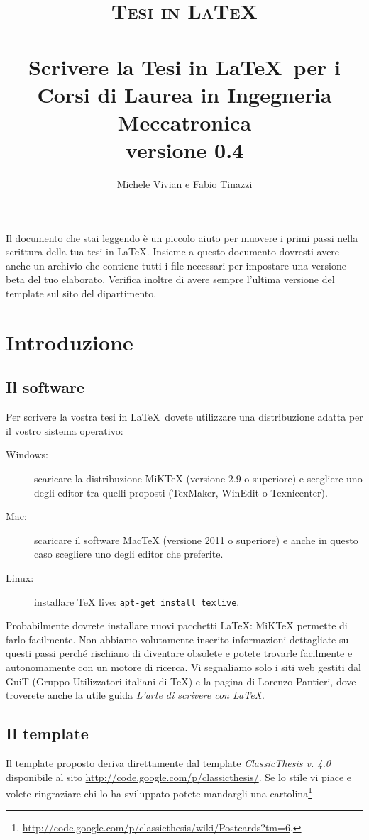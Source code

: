 \documentclass[paper=a4, fontsize=11pt]{scrartcl}	%
\title{
		\usefont{OT1}{bch}{b}{n}
		\normalfont \normalsize \textsc{Tesi in \LaTeX} \\ [25pt]
		\horrule{0.5pt} \\[0.4cm]
		\huge Scrivere la Tesi in \LaTeX~per i \\Corsi di Laurea in Ingegneria Meccatronica \\
		\Large versione 0.4
		\horrule{2pt} \\[0.5cm]
}
\author{
		\normalfont 								\normalsize
         Michele Vivian e Fabio Tinazzi \\[-3pt]		\normalsize
}
\date{}
\numberwithin{equation}{section}		%
\numberwithin{figure}{section}			%
\numberwithin{table}{section}				%
\begin{document}
\maketitle 

Il documento che stai leggendo \`e un piccolo aiuto per muovere i primi passi nella scrittura della tua tesi in \LaTeX. 
Insieme a questo documento dovresti avere anche un archivio che contiene tutti i file necessari per impostare una versione beta del tuo elaborato. 
Verifica inoltre di avere sempre l'ultima versione del template sul sito del dipartimento.

\section{Introduzione}
\subsection{Il software}
Per scrivere la vostra tesi in \LaTeX~dovete utilizzare una distribuzione adatta per il vostro sistema operativo:
\begin{description}
\item[Windows:] scaricare la distribuzione MiKTeX (versione 2.9 o superiore) e scegliere uno degli editor tra quelli proposti (TexMaker, WinEdit o Texnicenter). 
\item[Mac:] scaricare il software MacTeX (versione 2011 o superiore) e anche in questo caso scegliere uno degli editor che preferite.
\item[Linux:] installare TeX live: \texttt{apt-get install texlive}.
\end{description}

Probabilmente dovrete installare nuovi pacchetti \LaTeX: MiKTeX permette di farlo facilmente. 
Non abbiamo volutamente inserito informazioni dettagliate su questi passi perch\'e rischiano di diventare obsolete e potete trovarle facilmente e autonomamente con un motore di ricerca. 
Vi segnaliamo solo i siti web gestiti dal GuiT (Gruppo Utilizzatori italiani di TeX) e la pagina di Lorenzo Pantieri, dove troverete anche la utile guida \emph{L'arte di scrivere con \LaTeX}. 

\subsection{Il template}
Il template proposto deriva direttamente dal template \emph{ClassicThesis v. 4.0} disponibile al sito \url{http://code.google.com/p/classicthesis/}. 
Se lo stile vi piace e volete ringraziare chi lo ha sviluppato potete mandargli una cartolina\footnote{ \url{http://code.google.com/p/classicthesis/wiki/Postcards?tm=6}.}
\end{document}
